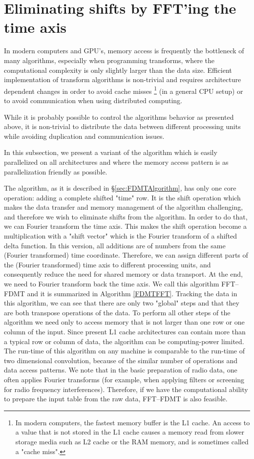 \documentclass[iop]{emulateapj}
\begin{document}
\section{Eliminating shifts by FFT'ing the time axis}\label{sec:FDMTFFT}
In modern computers and GPU's, memory access is frequently the bottleneck of many algorithms, especially when programming transforms, where the computational complexity is only slightly larger than the data size.
Efficient implementation of transform algorithms is non-trivial and requires architecture dependent changes in order to avoid cache misses \footnote{In modern computers, the fastest memory buffer is the L1 cache. An access to a value that is not stored in the L1 cache causes a memory read from slower storage media such as L2 cache or the RAM memory, and is sometimes called a "cache miss".} (in a general CPU setup) or to avoid communication when using distributed computing.

While it is probably possible to control the algorithms behavior as presented above, it is non-trivial to distribute the data between different processing units while avoiding duplication and communication issues.

In this subsection, we present a variant of the algorithm which is easily parallelized on all architectures and where the memory access pattern is as parallelization friendly as possible. 

The algorithm, as it is described in \S \ref{sec:FDMTAlgorithm}, has only one core operation: adding a complete shifted "time" row. It is the shift operation which makes the data transfer and memory management of the algorithm challenging, and therefore we wish to eliminate shifts from the algorithm.
In order to do that, we can Fourier transform the time axis. This makes the shift operation become a multiplication with a "shift vector" which is the Fourier transform of a shifted delta function.
In this version, all additions are of numbers from the same (Fourier transformed) time coordinate. Therefore, we can assign different parts of the (Fourier transformed) time axis to different processing units, and consequently reduce the need for shared memory or data transport. At the end, we need to Fourier transform back the time axis. We call this algorithm FFT--FDMT and it is summarized in Algorithm \ref{FDMTFFT}. 
Tracking the data in this algorithm, we can see that there are only two "global" steps and that they are both transpose operations of the data. To perform all other steps of the algorithm we need only to access memory that is not larger than one row or one column of the input. Since present L1 cache architectures can contain more than a typical row or column of data, the algorithm can be computing-power limited.
The run-time of this algorithm on any machine is comparable to the run-time of two dimensional convolution, because of the similar number of operations and data access patterns.
We note that in the basic preparation of radio data, one often applies Fourier transforms (for example, when applying filters or screening for radio frequency interferences). 
Therefore, if we have the computational ability to prepare the input table from the raw data, FFT--FDMT is also feasible.   
\end{document}

